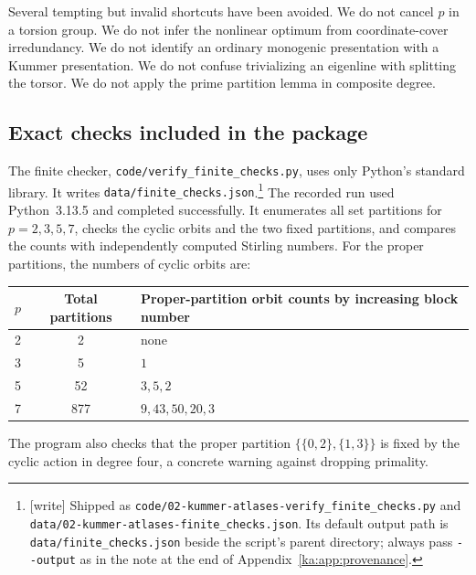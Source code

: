 \documentclass[11pt,a4paper]{article}
\theoremstyle{definition}
\theoremstyle{remark}
\newcommand{\code}[1]{{\small\nolinkurl{#1}}}
\begin{document}
Several tempting but invalid shortcuts have been avoided. We do not
cancel $p$ in a torsion group. We do not infer the nonlinear optimum
from coordinate-cover irredundancy. We do not identify an ordinary
monogenic presentation with a Kummer presentation. We do not confuse
trivializing an eigenline with splitting the torsor. We do not apply the
prime partition lemma in composite degree.

\subsection{Exact checks included in the package}
The finite checker, \code{code/verify_finite_checks.py}, uses only
Python's standard library. It writes \code{data/finite_checks.json}.\footnote{[write]
Shipped as \code{code/02-kummer-atlases-verify_finite_checks.py} and
\code{data/02-kummer-atlases-finite_checks.json}. Its default output path is
\code{data/finite_checks.json} beside the script's parent directory; always
pass \code{--output} as in the note at the end of Appendix~\ref{ka:app:provenance}.}
The recorded run used Python~3.13.5
and completed successfully. It enumerates all set partitions for
$p=2,3,5,7$, checks the cyclic orbits and the two fixed partitions,
and compares the counts with independently computed Stirling numbers.
For the proper partitions, the numbers of cyclic orbits are:
\begin{center}
\begin{tabular}{@{}ccl@{}}
\toprule
$p$ & Total partitions & Proper-partition orbit counts by increasing block number\\
\midrule
2 & 2 & none\\
3 & 5 & $1$\\
5 & 52 & $3,5,2$\\
7 & 877 & $9,43,50,20,3$\\
\bottomrule
\end{tabular}
\end{center}
The program also checks that the proper partition
$\{\{0,2\},\{1,3\}\}$ is fixed by the cyclic action in degree four,
a concrete warning against dropping primality.
\end{document}
